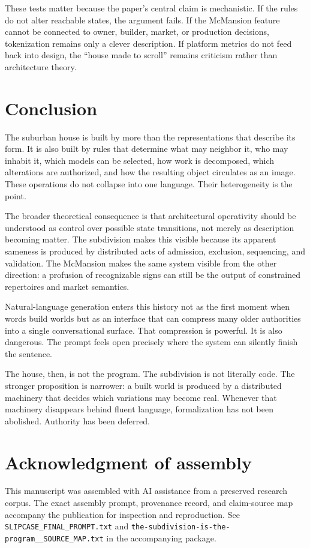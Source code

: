 \documentclass[11pt]{article}
\begin{document}
These tests matter because the paper's central claim is mechanistic. If the rules do not alter reachable states, the argument fails. If the McMansion feature cannot be connected to owner, builder, market, or production decisions, tokenization remains only a clever description. If platform metrics do not feed back into design, the ``house made to scroll'' remains criticism rather than architecture theory.

\section{Conclusion}
The suburban house is built by more than the representations that describe its form. It is also built by rules that determine what may neighbor it, who may inhabit it, which models can be selected, how work is decomposed, which alterations are authorized, and how the resulting object circulates as an image. These operations do not collapse into one language. Their heterogeneity is the point.

The broader theoretical consequence is that architectural operativity should be understood as control over possible state transitions, not merely as description becoming matter. The subdivision makes this visible because its apparent sameness is produced by distributed acts of admission, exclusion, sequencing, and validation. The McMansion makes the same system visible from the other direction: a profusion of recognizable signs can still be the output of constrained repertoires and market semantics.

Natural-language generation enters this history not as the first moment when words build worlds but as an interface that can compress many older authorities into a single conversational surface. That compression is powerful. It is also dangerous. The prompt feels open precisely where the system can silently finish the sentence.

The house, then, is not the program. The subdivision is not literally code. The stronger proposition is narrower: a built world is produced by a distributed machinery that decides which variations may become real. Whenever that machinery disappears behind fluent language, formalization has not been abolished. Authority has been deferred.

\section*{Acknowledgment of assembly}
This manuscript was assembled with AI assistance from a preserved research corpus. The exact assembly prompt, provenance record, and claim-source map accompany the publication for inspection and reproduction. See \texttt{SLIPCASE\_FINAL\_PROMPT.txt} and \texttt{the-subdivision-is-the-program\_\_SOURCE\_MAP.txt} in the accompanying package.
\end{document}
